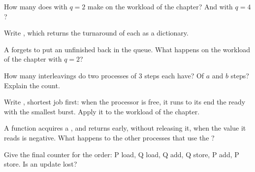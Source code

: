 \begin{exercise}[$\star$]\label{exo:g12:processes-and-scheduling:4}
How many  does  with $q = 2$ make on the workload of the chapter? And with $q = 4$?
\end{exercise}

\begin{exercise}[$\star$]\label{exo:g12:processes-and-scheduling:5}
Write , which returns the turnaround of each  as a dictionary.
\end{exercise}

\begin{exercise}[$\star\star$]\label{exo:g12:processes-and-scheduling:6}
A  forgets to put an unfinished  back in the queue. What happens on the workload of the chapter
with $q = 2$?
\end{exercise}

\begin{exercise}[$\star\star$]\label{exo:g12:processes-and-scheduling:7}
How many interleavings do two processes of $3$ steps each have? Of $a$ and $b$ steps? Explain the count.
\end{exercise}

\begin{exercise}[$\star\star$]\label{exo:g12:processes-and-scheduling:8}
Write , shortest job first: when the processor is free, it runs to its end the ready  with
the smallest burst. Apply it to the workload of the chapter.
\end{exercise}

\begin{exercise}[$\star\star$]\label{exo:g12:processes-and-scheduling:9}
A function acquires a , and returns early, without releasing it, when the value it reads is negative. What
happens to the other processes that use the ?
\end{exercise}

\begin{exercise}[$\star\star$]\label{exo:g12:processes-and-scheduling:10}
Give the final counter for the order: P load, Q load, Q add, Q store, P add, P store. Is an update lost?
\end{exercise}

